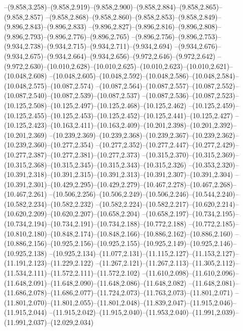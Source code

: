   --(9.858,3.258)--(9.858,2.919)--(9.858,2.900)--(9.858,2.884)--(9.858,2.865)--(9.858,2.857)%
  --(9.858,2.868)--(9.858,2.860)--(9.858,2.853)--(9.858,2.849)--(9.896,2.843)--(9.896,2.833)%
  --(9.896,2.827)--(9.896,2.816)--(9.896,2.808)--(9.896,2.793)--(9.896,2.776)--(9.896,2.765)%
  --(9.896,2.756)--(9.896,2.753)--(9.934,2.738)--(9.934,2.715)--(9.934,2.711)--(9.934,2.694)%
  --(9.934,2.676)--(9.934,2.675)--(9.934,2.664)--(9.934,2.656)--(9.972,2.646)--(9.972,2.642)%
  --(9.972,2.630)--(10.010,2.628)--(10.010,2.625)--(10.010,2.623)--(10.010,2.621)--(10.048,2.608)%
  --(10.048,2.605)--(10.048,2.592)--(10.048,2.586)--(10.048,2.584)--(10.048,2.575)--(10.087,2.574)%
  --(10.087,2.564)--(10.087,2.557)--(10.087,2.552)--(10.087,2.540)--(10.087,2.539)--(10.087,2.537)%
  --(10.087,2.536)--(10.087,2.523)--(10.125,2.508)--(10.125,2.497)--(10.125,2.468)--(10.125,2.462)%
  --(10.125,2.459)--(10.125,2.455)--(10.125,2.453)--(10.125,2.452)--(10.125,2.441)--(10.125,2.427)%
  --(10.125,2.423)--(10.163,2.411)--(10.163,2.409)--(10.201,2.398)--(10.201,2.392)--(10.201,2.369)%
  --(10.239,2.369)--(10.239,2.368)--(10.239,2.367)--(10.239,2.362)--(10.239,2.360)--(10.277,2.354)%
  --(10.277,2.352)--(10.277,2.447)--(10.277,2.429)--(10.277,2.387)--(10.277,2.381)--(10.277,2.373)%
  --(10.315,2.370)--(10.315,2.369)--(10.315,2.368)--(10.315,2.345)--(10.315,2.343)--(10.315,2.326)%
  --(10.353,2.320)--(10.391,2.318)--(10.391,2.315)--(10.391,2.313)--(10.391,2.307)--(10.391,2.304)%
  --(10.391,2.301)--(10.429,2.295)--(10.429,2.279)--(10.467,2.278)--(10.467,2.268)--(10.467,2.261)%
  --(10.506,2.256)--(10.506,2.249)--(10.506,2.246)--(10.544,2.240)--(10.582,2.234)--(10.582,2.232)%
  --(10.582,2.224)--(10.582,2.217)--(10.620,2.214)--(10.620,2.209)--(10.620,2.207)--(10.658,2.204)%
  --(10.658,2.197)--(10.734,2.195)--(10.734,2.194)--(10.734,2.191)--(10.734,2.188)--(10.772,2.188)%
  --(10.772,2.185)--(10.810,2.180)--(10.848,2.174)--(10.848,2.166)--(10.886,2.162)--(10.886,2.160)%
  --(10.886,2.156)--(10.925,2.156)--(10.925,2.155)--(10.925,2.149)--(10.925,2.146)--(10.925,2.138)%
  --(10.925,2.134)--(11.077,2.131)--(11.115,2.127)--(11.153,2.127)--(11.191,2.123)--(11.229,2.122)%
  --(11.267,2.121)--(11.267,2.113)--(11.305,2.112)--(11.534,2.111)--(11.572,2.111)--(11.572,2.102)%
  --(11.610,2.098)--(11.610,2.096)--(11.648,2.091)--(11.648,2.090)--(11.648,2.086)--(11.648,2.082)%
  --(11.648,2.081)--(11.686,2.078)--(11.686,2.077)--(11.724,2.073)--(11.763,2.073)--(11.801,2.071)%
  --(11.801,2.070)--(11.801,2.055)--(11.801,2.048)--(11.839,2.047)--(11.915,2.046)--(11.915,2.044)%
  --(11.915,2.042)--(11.915,2.040)--(11.953,2.040)--(11.991,2.039)--(11.991,2.037)--(12.029,2.034)%
